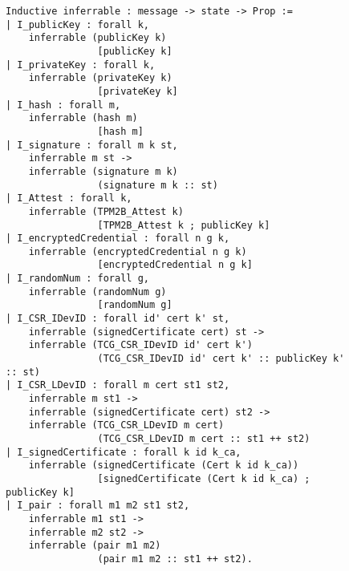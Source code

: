 \begin{figure}[h]
\begin{lstlisting}[language=Coq]
Inductive inferrable : message -> state -> Prop :=
| I_publicKey : forall k,
    inferrable (publicKey k)
                [publicKey k]
| I_privateKey : forall k,
    inferrable (privateKey k)
                [privateKey k]
| I_hash : forall m,
    inferrable (hash m)
                [hash m]
| I_signature : forall m k st,
    inferrable m st ->
    inferrable (signature m k)
                (signature m k :: st)
| I_Attest : forall k,
    inferrable (TPM2B_Attest k)
                [TPM2B_Attest k ; publicKey k]
| I_encryptedCredential : forall n g k,
    inferrable (encryptedCredential n g k)
                [encryptedCredential n g k]
| I_randomNum : forall g,
    inferrable (randomNum g)
                [randomNum g]
| I_CSR_IDevID : forall id' cert k' st,
    inferrable (signedCertificate cert) st ->
    inferrable (TCG_CSR_IDevID id' cert k')
                (TCG_CSR_IDevID id' cert k' :: publicKey k' :: st)
| I_CSR_LDevID : forall m cert st1 st2,
    inferrable m st1 ->
    inferrable (signedCertificate cert) st2 ->
    inferrable (TCG_CSR_LDevID m cert) 
                (TCG_CSR_LDevID m cert :: st1 ++ st2)
| I_signedCertificate : forall k id k_ca,
    inferrable (signedCertificate (Cert k id k_ca)) 
                [signedCertificate (Cert k id k_ca) ; publicKey k]
| I_pair : forall m1 m2 st1 st2,
    inferrable m1 st1 ->
    inferrable m2 st2 -> 
    inferrable (pair m1 m2) 
                (pair m1 m2 :: st1 ++ st2).
\end{lstlisting}
\end{figure}

